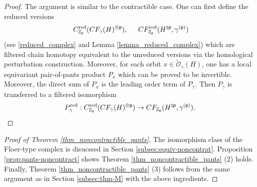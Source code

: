 \documentclass[reqno, 10pt]{amsart}
\numberwithin{equation}{section}
\numberwithin{equation}{section}
\theoremstyle{definition}
\theoremstyle{remark}
\newcommand{\beqn}{\begin{equation*}}
\newcommand{\eeqn}{\end{equation*}}
\newcommand{\mb}{\mathbb}
\newcommand{\mc}{\mathcal}
\newcommand{\p}{{\sf p}}
\newcommand{\zp}{{{\mb Z}_{\sf p}}}
\begin{document}
\begin{proof}
The argument is similar to the contractible case. One can first define the reduced versions
\begin{align*}
&\ C_{\zp}^{\rm red}(CF_\gamma(H)^{\otimes \p}),\ &\ CF_{\zp}^{\rm red}(H^{\natural \p}, \gamma^{(\p)})
\end{align*}
(see \eqref{reduced_complex} and Lemma \ref{lemma_reduced_complex}) which are filtered chain homotopy equivalent to the unreduced versions via the homological perturbation construction. Moreover, for each orbit $x \in \tilde {\mc O}_\gamma(H)$, one has a local equivariant pair-of-pants product $P_x$ which can be proved to be invertible. Moreover, the direct sum of $P_x$ is the leading order term of $P_\gamma$. Then $P_\gamma$ is transferred to a filtered isomorphism
\beqn
P_\gamma^{\rm red}: C_{\zp}^{\rm red}(CF_\gamma(H)^{\otimes \p}) \to CF_{\zp}(H^{\natural \p}, \gamma^{(\p)}). \qedhere
\eeqn
\end{proof}

\begin{proof}[Proof of Theorem \ref{thm_noncontractible_pants}]
    The isomorphism class of the Floer-type complex is disucssed in Section \ref{subsec:equiv-noncontrat}. Proposition \ref{prop:pants-noncontract} shows Theorem \ref{thm_noncontractible_pants} (2) holds. Finally, Theorem \ref{thm_noncontractible_pants} (3) follows from the same argument as in Section \ref{subsec:thm-M} with the above ingredients.
\end{proof}











\end{document}
